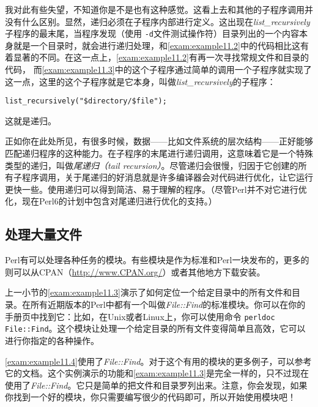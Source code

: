 我对此有些失望，不知道你是不是也有这种感觉。这看上去和其他的子程序调用并没有什么区别。显然，递归必须在子程序内部进行定义。这出现在\textit{list\_recursively}子程序的最末尾，当程序发现（使用 \verb|-d|文件测试操作符）目录列出的一个内容本身就是一个目录时，就会进行递归处理，和\autoref{exam:example11.2}中的代码相比这有着显著的不同。在这一点上，\autoref{exam:example11.2}有再一次寻找常规文件和目录的代码，
而\autoref{exam:example11.3}中的这个子程序通过简单的调用一个子程序就实现了这一点，这里的这个子程序就是它本身，叫做\textit{list\_recursively}的子程序：

\begin{lstlisting}
list_recursively("$directory/$file");
\end{lstlisting}

这就是递归。

正如你在此处所见，有很多时候，数据——比如文件系统的层次结构——正好能够匹配递归程序的这种能力。在子程序的末尾进行递归调用，这意味着它是一个特殊类型的递归，叫做\textit{尾递归（tail
recursion）}。尽管递归会很慢，归因于它创建的所有子程序调用，关于尾递归的好消息就是许多编译器会对代码进行优化，让它运行更快一些。使用递归可以得到简洁、易于理解的程序。（尽管Perl并不对它进行优化，现在Perl6的计划中包含对尾递归进行优化的支持。）

\subsection{处理大量文件}
\label{sect:section11.2.3}
Perl有可以处理各种任务的模块。有些模块是作为标准和Perl一块发布的，更多的则可以从CPAN（\href{http://www.CPAN.org/}{http://www.CPAN.org/}）或者其他地方下载安装。

上一小节的\autoref{exam:example11.3}演示了如何定位一个给定目录中的所有文件和目录。在所有近期版本的Perl中都有一个叫做\textit{File::Find}的标准模块。你可以在你的手册页中找到它：比如，在Unix或者Linux上，你可以使用命令 \verb|perldoc File::Find|。这个模块让处理一个给定目录的所有文件变得简单且高效，它可以进行你指定的各种操作。

\autoref{exam:example11.4}使用了\textit{File::Find}。对于这个有用的模块的更多例子，可以参考它的文档。这个实例演示的功能和\autoref{exam:example11.3}是完全一样的，只不过现在使用了\textit{File::Find}。它只是简单的把文件和目录罗列出来。注意，你会发现，如果你找到一个好的模块，你只需要编写很少的代码即可，所以开始使用模块吧！



